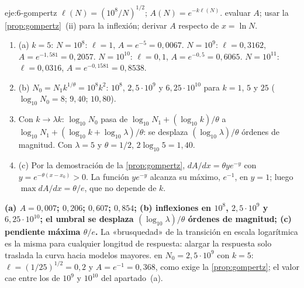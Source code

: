 \begin{solucion}{eje:6-gompertz}
\datos $\ell(N)=(10^{8}/N)^{1/2}$; $A(N)=e^{-k\ell(N)}$.
\planteamiento evaluar $A$; usar la \cref{prop:gompertz}~(ii) para la inflexión; derivar $A$ respecto de $x=\ln N$.
\pasos
\begin{enumerate}[label=\arabic*.]
  \item (a) $k=5$: $N=10^{8}$: $\ell=1$, $A=e^{-5}=0{,}0067$. $N=10^{9}$: $\ell=0{,}3162$, $A=e^{-1{,}581}=0{,}2057$. $N=10^{10}$: $\ell=0{,}1$, $A=e^{-0{,}5}=0{,}6065$. $N=10^{11}$: $\ell=0{,}0316$, $A=e^{-0{,}1581}=0{,}8538$.
  \item (b) $N_0=N_1k^{1/\theta}=10^{8}k^{2}$: $10^{8}$, $2{,}5\cdot 10^{9}$ y $6{,}25\cdot 10^{10}$ para $k=1$, $5$ y $25$ ($\log_{10}N_0=8$; $9{,}40$; $10{,}80$).
  \item Con $k\to\lambda k$: $\log_{10}N_0$ pasa de $\log_{10}N_1+(\log_{10}k)/\theta$ a $\log_{10}N_1+(\log_{10}k+\log_{10}\lambda)/\theta$: se desplaza $(\log_{10}\lambda)/\theta$ órdenes de magnitud. Con $\lambda=5$ y $\theta=1/2$, $2\log_{10}5=1{,}40$.
  \item (c) Por la demostración de la \cref{prop:gompertz}, $dA/dx=\theta ye^{-y}$ con $y=e^{-\theta(x-x_0)}>0$. La función $ye^{-y}$ alcanza su máximo, $e^{-1}$, en $y=1$; luego $\max dA/dx=\theta/e$, que no depende de $k$.
\end{enumerate}
\resultado \textbf{(a) $A=0{,}007$; $0{,}206$; $0{,}607$; $0{,}854$; (b) inflexiones en $10^{8}$, $2{,}5\cdot 10^{9}$ y $6{,}25\cdot 10^{10}$; el umbral se desplaza $(\log_{10}\lambda)/\theta$ órdenes de magnitud; (c) pendiente máxima $\theta/e$.} La «brusquedad» de la transición en escala logarítmica es la misma para cualquier longitud de respuesta: alargar la respuesta solo traslada la curva hacia modelos mayores.
\comprobacion en $N_0=2{,}5\cdot 10^{9}$ con $k=5$: $\ell=(1/25)^{1/2}=0{,}2$ y $A=e^{-1}=0{,}368$, como exige la \cref{prop:gompertz}; el valor cae entre los de $10^{9}$ y $10^{10}$ del apartado~(a).
\end{solucion}

